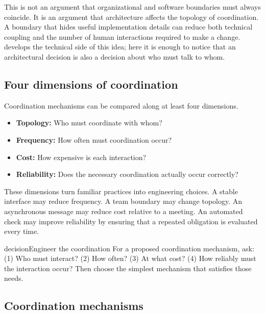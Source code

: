 This is not an argument that organizational and software boundaries must always coincide. It is an
argument that architecture affects the topology of coordination. A boundary that hides useful
implementation details can reduce both technical coupling and the number of human interactions
required to make a change. \citet{ch-architecture} develops the technical side of this idea; here it is
enough to notice that an architectural decision is also a decision about who must talk to whom.

\subsection{Four dimensions of coordination}\label{sec-four-dimensions}

Coordination mechanisms can be compared along at least four dimensions.

\begin{itemize}
\tightlist
\item
  \textbf{Topology:} Who must coordinate with whom?
\item
  \textbf{Frequency:} How often must coordination occur?
\item
  \textbf{Cost:} How expensive is each interaction?
\item
  \textbf{Reliability:} Does the necessary coordination actually occur correctly?
\end{itemize}

These dimensions turn familiar practices into engineering choices. A stable interface may reduce
frequency. A team boundary may change topology. An asynchronous message may reduce cost relative to
a meeting. An automated check may improve reliability by ensuring that a repeated obligation is
evaluated every time.

\begin{bookbox}{decision}{Engineer the coordination} %
For a proposed coordination mechanism, ask: (1) Who must interact? (2) How often? (3) At what cost?
(4) How reliably must the interaction occur? Then choose the simplest mechanism that satisfies those
needs.
\end{bookbox}

\subsection{Coordination mechanisms}\label{sec-coordination-mechanisms}

